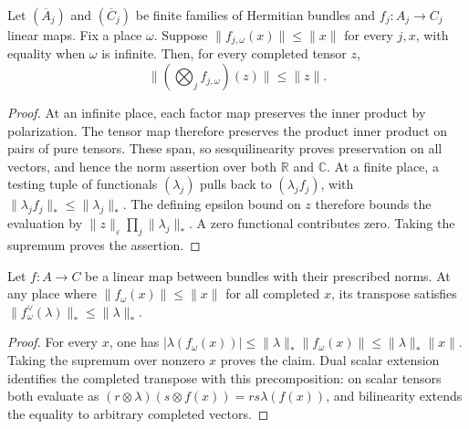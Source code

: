 \begin{lemma}
\label{lem:contraction-tensor-maps}
\leanok
Let $(\overline A_j)$ and $(\overline C_j)$ be finite families of Hermitian
bundles and $f_j:A_j\to C_j$ linear maps. Fix a place $\omega$.
Suppose $\|f_{j,\omega}(x)\|\leq\|x\|$ for every $j,x$, with equality
when $\omega$ is infinite. Then, for every completed tensor $z$,
\[
 \|(\bigotimes_j f_{j,\omega})(z)\|\leq\|z\|.
\]
\end{lemma}
\begin{proof}
At an infinite place, each factor map preserves the inner product by
polarization. The tensor map therefore preserves the product inner product
on pairs of pure tensors. These span, so sesquilinearity proves preservation
on all vectors, and hence the norm assertion over both $\mathbb R$ and $\mathbb C$.
At a finite place, a testing tuple of functionals $(\lambda_j)$ pulls back to
$(\lambda_j f_j)$, with $\|\lambda_j f_j\|_*\leq\|\lambda_j\|_*$.
The defining epsilon bound on $z$ therefore bounds the evaluation by
$\|z\|_\varepsilon\prod_j\|\lambda_j\|_*$.
A zero functional contributes zero. Taking the supremum proves the assertion.
\end{proof}

\begin{lemma}
\label{lem:contraction-dual-map}
\leanok
Let $f:A\to C$ be a linear map between bundles with their prescribed norms.
At any place where $\|f_\omega(x)\|\leq\|x\|$ for all completed $x$,
its transpose satisfies $\|f_\omega^\vee(\lambda)\|_*\leq\|\lambda\|_*$.
\end{lemma}
\begin{proof}
For every $x$, one has
$|\lambda(f_\omega(x))|\leq\|\lambda\|_*\|f_\omega(x)\|
\leq\|\lambda\|_*\|x\|$. Taking the supremum over nonzero $x$ proves
the claim. Dual scalar extension identifies the completed transpose with
this precomposition: on scalar tensors both evaluate as
$(r\otimes\lambda)(s\otimes f(x))=rs\lambda(f(x))$, and bilinearity
extends the equality to arbitrary completed vectors.
\end{proof}

